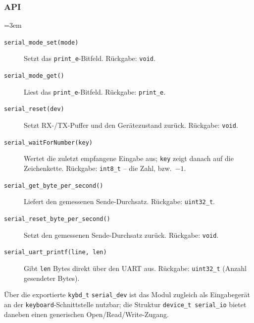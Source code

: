 \subsubsection*{API}
{\sloppy\emergencystretch=3em
\begin{description}
\item[\texttt{serial\_mode\_set(mode)}] Setzt das \verb|print_e|-Bitfeld.
  Rückgabe: \verb|void|.
\item[\texttt{serial\_mode\_get()}] Liest das \verb|print_e|-Bitfeld.
  Rückgabe: \verb|print_e|.
\item[\texttt{serial\_reset(dev)}] Setzt RX-/TX-Puffer und den Gerätezustand
  zurück. Rückgabe: \verb|void|.
\item[\texttt{serial\_waitForNumber(key)}] Wertet die zuletzt empfangene
  Eingabe aus; \verb|key| zeigt danach auf die Zeichenkette. Rückgabe:
  \verb|int8_t| -- die Zahl, bzw.\ $-1$.
\item[\texttt{serial\_get\_byte\_per\_second()}] Liefert den gemessenen
  Sende-Durchsatz. Rückgabe: \verb|uint32_t|.
\item[\texttt{serial\_reset\_byte\_per\_second()}] Setzt den gemessenen
  Sende-Durchsatz zurück. Rückgabe: \verb|void|.
\item[\texttt{serial\_uart\_printf(line, len)}] Gibt \verb|len| Bytes direkt
  über den UART aus. Rückgabe: \verb|uint32_t| (Anzahl gesendeter Bytes).
\end{description}
\par}

\noindent Über die exportierte \verb|kybd_t| \verb|serial_dev| ist das Modul
zugleich als Eingabegerät an der \verb|keyboard|-Schnittstelle nutzbar; die
Struktur \verb|device_t serial_io| bietet daneben einen generischen
Open/Read/Write-Zugang.
